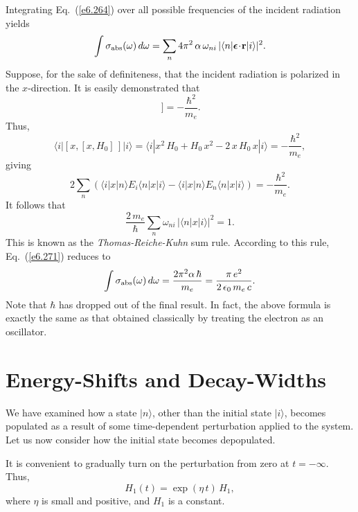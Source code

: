 Integrating Eq.~(\ref{e6.264}) over all possible frequencies of the incident radiation
yields
\begin{equation}\label{e6.271}
\int \sigma_{\rm abs} (\omega)\,d\omega = \sum_n 4\pi^2\,\alpha\,\omega_{ni}\,
|\langle n|\mbox{\boldmath$\epsilon$}
\!\cdot\!{\bf r}|i\rangle|^2.
\end{equation}
Suppose, for the sake of definiteness, that the incident radiation is
polarized in the $x$-direction. It is easily demonstrated
that
\begin{equation}
[x, [x, H_0] \,] = - \frac{\hbar^2}{m_e}.
\end{equation}
Thus,
\begin{equation}
\langle i|[ x, [x, H_0] \,] |i\rangle = \langle i| x^2 \,H_0 + H_0\, x^2 - 2 \,x\, H_0 \,x|
i\rangle =
- \frac{\hbar^2}{m_e},
\end{equation}
giving
\begin{equation}
2\sum_n \left(\langle i|x|n\rangle E_i \langle n|x|i\rangle - 
\langle i|x|n\rangle E_n \langle n|x|i\rangle\right) = - \frac{\hbar^2}{m_e}.
\end{equation}
It follows that
\begin{equation}
\frac{2 \,m_e}{\hbar} \sum_n \omega_{ni}\, |\langle n|x|i\rangle|^2 = 1.
\end{equation}
This is known as the {\em Thomas-Reiche-Kuhn} sum rule.
According to this rule, Eq.~(\ref{e6.271}) reduces to
\begin{equation}
\int \sigma_{\rm abs} (\omega)\,d\omega = \frac{2\pi^2 \alpha\, \hbar}{m_e}
= \frac{\pi\, e^2}{2\,\epsilon_0 \,m_e\, c}.
\end{equation}
Note that $\hbar$ has dropped out of the final result. In fact, the above
formula is exactly the same as that obtained classically by treating the
electron as an oscillator. 

\section{Energy-Shifts and Decay-Widths}\label{s6.18}
We have examined how a state $|n\rangle$, other than the initial
state $|i\rangle$, becomes populated as a result of some time-dependent
perturbation applied to the system. Let us now consider 
how the initial state becomes depopulated. 

It is convenient to gradually turn on the perturbation from zero at
 $t=-\infty$. Thus, 
\begin{equation}
H_1(t) = \exp(\eta\,t)\,H_1,
\end{equation}
where $\eta$ is small and positive, and $H_1$ is a constant. 


